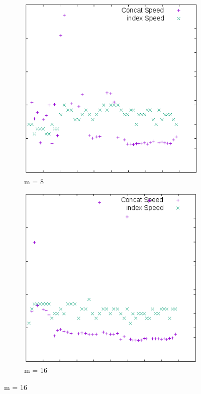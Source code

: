 \documentclass[11pt,a4paper,oneside]{article}
\begin{document}
\begin{figure}[H]
\begin{subfigure}[b]{0.3\textwidth}
        \includegraphics[width=\textwidth]{img/plot8.png}
        \caption{m = 8}
    \end{subfigure}
    \begin{subfigure}[b]{0.3\textwidth}
        \includegraphics[width=\textwidth]{img/plot16.png}
        \caption{m = 16}
    \end{subfigure}
    

\end{figure}
\end{document}
